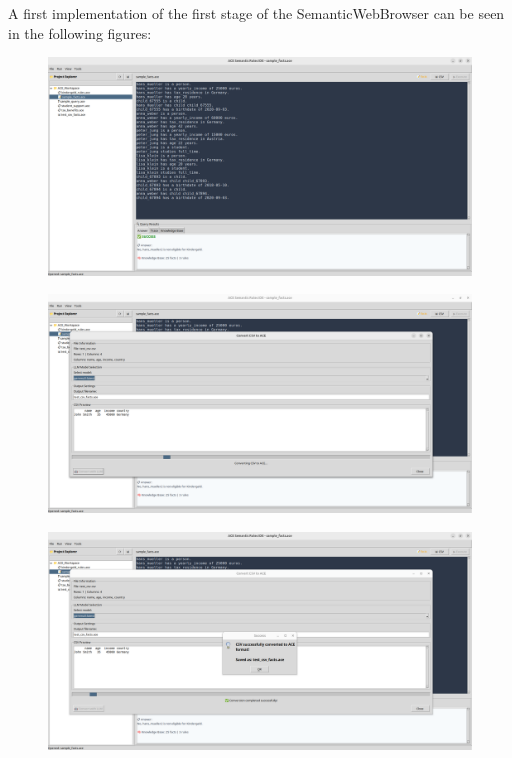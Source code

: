 \documentclass[12pt,a4paper]{article}
\begin{document}
A first implementation of the first stage of the SemanticWebBrowser can be seen in the following figures:

\begin{figure}[h]
    \includegraphics[width=16cm]{ace_code_screenshot_1}
\end{figure}

\begin{figure}[h]
    \includegraphics[width=16cm]{ace_code_screenshot_2}
\end{figure}

\begin{figure}[h]
    \includegraphics[width=16cm]{ace_code_screenshot_3}
\end{figure}
\end{document}

